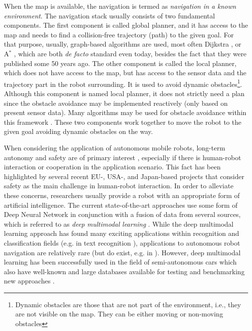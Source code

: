 When the map is available, the navigation is termed as \emph{navigation in a known environment}. The navigation stack usually consists of two fundamental components. The first component is called global planner, and it has access to the map and needs to find a collision-free trajectory (path) to the given goal. For that purpose, usually, graph-based algorithms are used, most often Dijkstra \cite{Dijkstra1959}, or A$^*$ \cite{Hart1968}, which are both \emph{de facto} standard even today, besides the fact that they were published some 50 years ago. The other component is called the local planner, which does not have access to the map, but has access to the sensor data and the trajectory part in the robot surrounding. It is used to avoid dynamic obstacles\footnote{Dynamic obstacles are those that are not part of the environment, i.e., they are not visible on the map. They can be either moving or non-moving obstacles}. Although this component is named local planner, it does not strictly need a plan since the obstacle avoidance may be implemented reactively (only based on present sensor data). Many algorithms may be used for obstacle avoidance within this framework \cite{Khatib1985,Minguez2005,Fox1999,Borenstein1991,Fiorini1998}. These two components work together to move the robot to the given goal avoiding dynamic obstacles on the way.

When considering the application of autonomous mobile robots, long-term autonomy and safety are of primary interest \cite{Kunze2018}, especially if there is human-robot interaction or cooperation in the application scenario. This fact has been highlighted by several recent EU-, USA-, and Japan-based projects that consider safety as the main challenge in human-robot interaction\cite{Guiochet2017}. In order to alleviate these concerns, researchers usually provide a robot with an appropriate form of artificial intelligence. The current state-of-the-art approaches use some form of Deep Neural Network \cite{Sze2017} in conjunction with a fusion of data from several sources, which is referred to as \emph{deep multimodal learning} \cite{Ramachandram2017}. While the deep multimodal learning approach has found many exciting applications within recognition and classification fields (e.g. in text recognition  \cite{Wang2017}), applications to autonomous robot navigation are relatively rare (but do exist, e.g. in \cite{Zhu2017,Giusti2016,Ran2017}). However, deep multimodal learning has been successfully used in the field of semi-autonomous cars \cite{Ramachandram2017,Chen2015,Jain2016} which also have well-known and large databases available for testing and benchmarking new approaches \cite{Geiger2013,Maddern2016}. 

